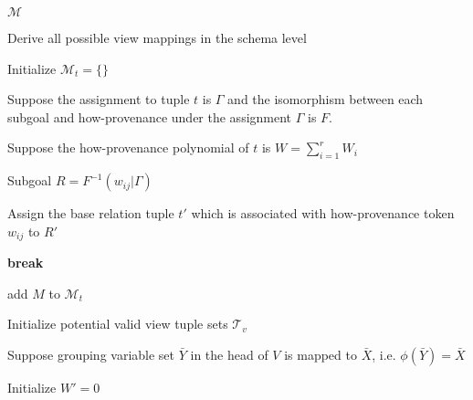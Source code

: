 \begin{appendix}
\begin{algorithm}[h!]


 \Return $\mathcal{M}$

 \caption{Derive all possible view mappings in the schema level}
 \label{view_mapping_schema_level}
 \end{algorithm}


\begin{algorithm}[h!] 
\footnotesize


 Initialize $\mathcal{M}_t = \{\}$
 
 Suppose the assignment to tuple $t$ is $\Gamma$ and the isomorphism between each subgoal and how-provenance under the assignment $\Gamma$ is $F$.

Suppose the how-provenance polynomial of $t$ is $W = \sum_{i=1}^rW_i$



 {

 	{
        {
        	Subgoal $R=F^{-1}(w_{ij}|\Gamma)$
            
            {
      			Assign the base relation tuple $t'$ which is associated with how-provenance token $w_{ij}$ to $R'$      		
            }
        }
        {
        	\textbf{break}
        }
    }
    {
		add $M$ to $\mathcal{M}_t$
    }
    {

		Initialize potential valid view tuple sets $\mathcal{T}_v$
    	
        Suppose grouping variable set $\bar{Y}$ in the head of $V$ is mapped to $\bar{X}$, i.e. $\phi(\bar{Y}) = \bar{X}$
        
        Initialize $W' = 0$
        
}}
\end{algorithm}
\end{appendix}
